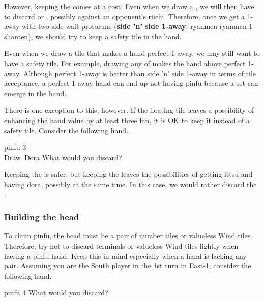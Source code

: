 \bigskip
However, keeping the {\large{}} comes at a cost. Even when we draw a {\large{}}, we will then have to discard {\large{}} or {\large{}}, possibly against an opponent's {\jap riichi}. 
Therefore, once we get a 1-away with two side-wait protoruns ({\bf side 'n' side 1-away}; {\jap ryanmen-ryanmen 1-shanten}), we should try to keep a safety tile in the hand.

\bigskip
Even when we draw a tile that makes a hand perfect 1-away, we may still want to have a safety tile. For example, drawing any of {\large{}} makes the hand above perfect 1-away. 
Although perfect 1-away is better than side 'n' side 1-away in terms of tile acceptance, a perfect 1-away hand can end up not having {\jap pinfu} because a set can emerge in the hand. 

\vfill
There is one exception to this, however. If the floating tile leaves a possibility of enhancing the hand value by at least three {\jap fan}, it is OK to keep it instead of a safety tile. Consider the following hand. 
\begin{itembox}[r]{{\jap pinfu} 3}
\bp
{}~\xi~\\
\hspace{283pt}\footnotesize{Draw}~\footnotesize{\jap Dora}
\ep
\vspace{-17pt}What would you discard? \vspace{-5pt}
\end{itembox}

\bigskip
\noindent Keeping the {\large\xi} is safer, but keeping the {\large{}} leaves the possibilities of getting {\jap ittsu} and having {\jap dora}, possibly at the same time. In this case, we would rather discard the {\large\xi}. 

\newpage

\subsubsection{Building the head}
To claim {\jap pinfu}, the head must be a pair of number tiles or valueless Wind tiles. Therefore, try not to discard terminals or valueless Wind tiles lightly when having a {\jap pinfu} hand. Keep this in mind especially when a hand is lacking any pair. Assuming you are the South player in the 1st turn in East-1, consider the following hand. 
\begin{itembox}[r]{{\jap pinfu} 4}
\bp
{}\xi\fa
\ep
\vspace{-10pt}What would you discard? \vspace{-5pt}
\end{itembox}

